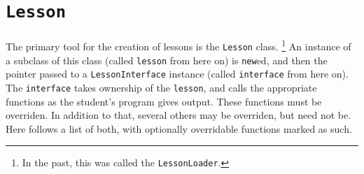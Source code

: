\documentclass[12pt,a4paper]{report}
\begin{document}
		\section{\texttt{Lesson}}
		The primary tool for the creation of lessons is the \texttt{Lesson} class.
		\footnote{In the past, this was called the \texttt{LessonLoader}.} An instance
		of a subclass of this class (called \texttt{lesson} from here on) is
		\texttt{new}ed, and then the pointer passed to a \texttt{LessonInterface}
		instance (called \texttt{interface} from here on).  The \texttt{interface} takes
		ownership of the \texttt{lesson}, and calls the appropriate functions as the
		student's program gives output.  These functions must be overriden.
		In addition to that, several others may be overriden, but need not be.  Here follows
		a list of both, with optionally overridable functions marked as such.
\end{document}
